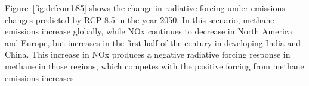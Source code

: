 Figure~\ref{fig:drfcomb85} shows the change in radiative forcing under emissions changes predicted by RCP 8.5 in the year 2050. In this scenario, methane emissions increase globally, while NOx continues to decrease in North America and Europe, but increases in the first half of the century in developing India and China. This increase in NOx produces a negative radiative forcing response in methane in those regions, which competes with the positive forcing from methane emissions increases.